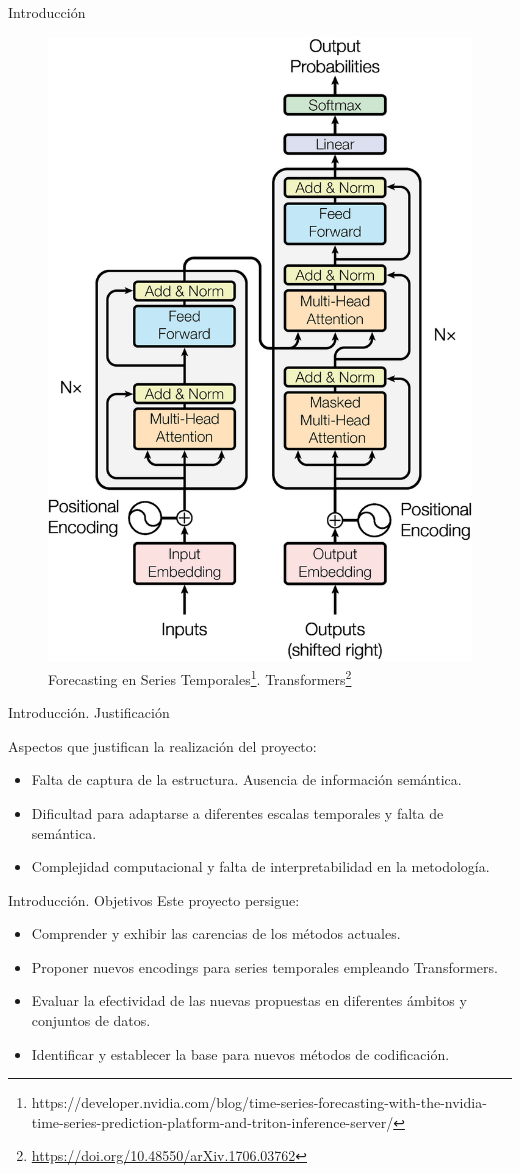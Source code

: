 \documentclass[compress]{beamer}
\begin{document}
\begin{frame}{Introducción}
\begin{figure}
\begin{minipage}{0.4\textwidth}
				\includegraphics[height=\columnwidth]{pic/trans.png}
			\end{minipage}
			\caption[]{Forecasting en Series Temporales\footnote{{https://developer.nvidia.com/blog/time-series-forecasting-with-the-nvidia-time-series-prediction-platform-and-triton-inference-server/}}. Transformers\footnote{
					\url{https://doi.org/10.48550/arXiv.1706.03762}}}
		\end{figure}
	\end{frame}
	
	\begin{frame}{Introducción. Justificación}
		
		Aspectos que justifican la realización del proyecto:
		\begin{itemize}
			\item Falta de captura de la estructura. Ausencia de información semántica.
			\item Dificultad para adaptarse a diferentes escalas temporales y falta de semántica.
			\item Complejidad computacional y falta de interpretabilidad en la metodología.
		\end{itemize}
	\end{frame}
	
	\begin{frame}{Introducción. Objetivos}
		Este proyecto persigue:
		\begin{itemize}
			\item Comprender y exhibir las carencias de los métodos actuales.
			\item Proponer nuevos encodings para series temporales empleando Transformers.
			\item Evaluar la efectividad de las nuevas propuestas en diferentes ámbitos y conjuntos de datos.
			\item Identificar y establecer la base para nuevos métodos de codificación.
		\end{itemize}
	\end{frame}
	
\end{document}
